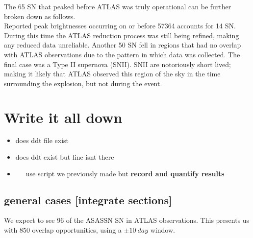 \documentclass[aps,prb,twocolumn,superscriptaddress]{revtex4-1}
\begin{document}
\indent The 65 SN that peaked before ATLAS was truly operational can be further broken down as follows.\\
Reported peak brightnesses occurring on or before 57364 accounts for 14 SN. 
During this time the ATLAS reduction process was still being refined, making 
any reduced data unreliable.
Another 50 SN fell in regions that had no overlap with ATLAS observations due 
to the pattern in which data was collected.
The final case was a Type II supernova (SNII).
SNII are notoriously short lived; making it likely that ATLAS observed this region of the sky in the 
time surrounding the explosion, but not during the event.



\section{Write it all down}
\begin{itemize}
	\item{} does ddt file exist
	\item{} does ddt exist but line isnt there
	\item{} ~~~use script we previously made but {\bf record and quantify results}
\end{itemize}


\subsection{general cases [integrate sections]}
We expect to see 96 of the ASASSN SN in ATLAS observations. 
This presents us with 850 overlap opportunities, using a $\pm10~day$ window.
\end{document}
